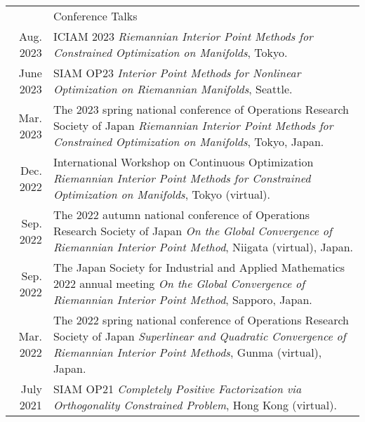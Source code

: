\documentclass[letterpaper,11pt]{article}
\newcommand{\headingfont}{\Large\color{OliveGreen}}
\newenvironment{SectionTable}[1]{
	\renewcommand*{\arraystretch}{1.7}
	\setlength{\tabcolsep}{10pt}
	\begin{longtable}{Rp{5.2in}} & #1 \\ %
	}
	{
	\end{longtable}\vspace{-.3cm}
}
\begin{document}
\begin{SectionTable}{\headingfont Conference Talks}
	Aug. 2023 & ICIAM 2023 \newline
	\textit{Riemannian Interior Point Methods for Constrained Optimization on Manifolds}, Tokyo. \\
	
	June 2023 & SIAM OP23 \newline 
	\textit{Interior Point Methods for Nonlinear Optimization on Riemannian Manifolds}, Seattle. \\
	
	
	Mar. 2023 & The 2023 spring national conference of Operations Research Society of Japan \newline 
	\textit{Riemannian Interior Point Methods for Constrained Optimization on Manifolds}, Tokyo, Japan. \\
	
	Dec. 2022 & International Workshop on Continuous Optimization \newline 
	\textit{Riemannian Interior Point Methods for Constrained Optimization on Manifolds}, Tokyo (virtual). \\
	
	Sep. 2022 & The 2022 autumn national conference of Operations Research Society of Japan \newline
	\textit{On the Global Convergence of Riemannian Interior Point Method}, Niigata (virtual), Japan. \\
	
	Sep. 2022 & The Japan Society for Industrial and Applied Mathematics 2022 annual meeting \newline
	\textit{On the Global Convergence of Riemannian Interior Point Method}, Sapporo, Japan. \\
	
	Mar. 2022 & The 2022 spring national conference of Operations Research Society of Japan \newline
	\textit{Superlinear and Quadratic Convergence of Riemannian Interior Point Methods}, Gunma (virtual), Japan. \\
	
	July 2021 &	SIAM OP21 \newline 
	\textit{Completely Positive Factorization via Orthogonality Constrained Problem}, Hong Kong (virtual). \\
	

\end{SectionTable}
\end{document}
